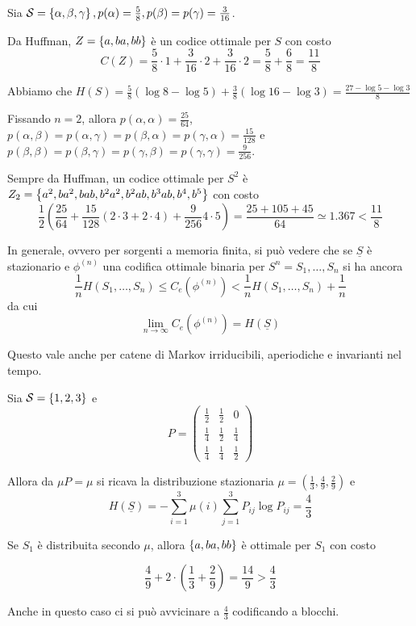 \begin{example}{}
  Sia \(\SCal = \set{\alpha, \beta, \gamma}, p(\alpha) = \frac{5}{8}, p(\beta) = p(\gamma) = \frac{3}{16}\).

  Da Huffman, \(Z=\set{a, ba, bb}\) è un codice ottimale per \(S\) con costo
  \[C(Z) = \frac{5}{8} \cdot 1 + \frac{3}{16} \cdot 2 + \frac{3}{16} \cdot 2 = \frac{5}{8} + \frac{6}{8} = \frac{11}{8}\]
  
  Abbiamo che \(H(S) = \frac{5}{8}(\log 8 - \log 5) + \frac{3}{8}(\log 16 - \log 3) = \frac{27-\log 5 -\log3}{8}\)

  Fissando \(n=2\), allora \(p(\alpha, \alpha) = \frac{25}{64}\), \(p(\alpha, \beta)=p(\alpha, \gamma) = p(\beta, \alpha) = p(\gamma, \alpha) = \frac{15}{128}\) e \(p(\beta, \beta) = p(\beta, \gamma) = p(\gamma, \beta) = p(\gamma, \gamma) = \frac{9}{256}\).
  
  Sempre da Huffman, un codice ottimale per \(S^2\) è \(Z_2 = \set{a^2, ba^2, bab,b^2a^2, b^2ab,b^3ab,b^4,b^5}\) con costo
  \[\frac{1}{2}\left(\frac{25}{64}+\frac{15}{128}(2\cdot 3 + 2\cdot 4) + \frac{9}{256}4\cdot 5\right) = \frac{25+105+45}{64} \simeq 1.367<\frac{11}{8}\]
\end{example}

In generale, ovvero per sorgenti a memoria finita, si può vedere che se \(\underline{S}\) è stazionario e \(\phi^{(n)}\) una codifica ottimale binaria per \(S^n=S_1, \ldots, S_n\) si ha ancora
\[\frac{1}{n}H(S_1,\ldots, S_n)\leq C_e(\phi^{(n)}) < \frac{1}{n}H(S_1,\ldots, S_n) + \frac{1}{n}\]
da cui
\[\lim_{n\to \infty} C_e(\phi^{(n)}) = H(\underline{S})\]

Questo vale anche per catene di Markov irriducibili, aperiodiche e invarianti nel tempo.

\begin{example}{}
  Sia \(\SCal = \set{1,2,3}\) e 
  \begin{equation*}
    \renewcommand{\arraystretch}{1.5} %
    P = \begin{pmatrix}
      \frac{1}{2} & \frac{1}{2} & 0 \\
      \frac{1}{4} & \frac{1}{2} & \frac{1}{4} \\
      \frac{1}{4} & \frac{1}{4} & \frac{1}{2}
    \end{pmatrix}
  \end{equation*}
  
  Allora da \(\mu P = \mu\) si ricava la distribuzione stazionaria \(\mu = \left(\frac{1}{3}, \frac{4}{9}, \frac{2}{9}\right)\) e 
  \[H(\underline{S}) = -\sum_{i=1}^3 \mu(i)\sum_{j=1}^3 P_{ij} \log P_{ij} = \frac{4}{3}\]

  Se \(S_1\) è distribuita secondo \(\mu\), allora \(\set{a,ba,bb}\) è ottimale per \(S_1\) con costo 
  
  \[\frac{4}{9} + 2\cdot (\frac{1}{3} + \frac{2}{9}) = \frac{14}{9} > \frac{4}{3}\]

  Anche in questo caso ci si può avvicinare a \(\frac{4}{3}\) codificando a blocchi.
\end{example}

